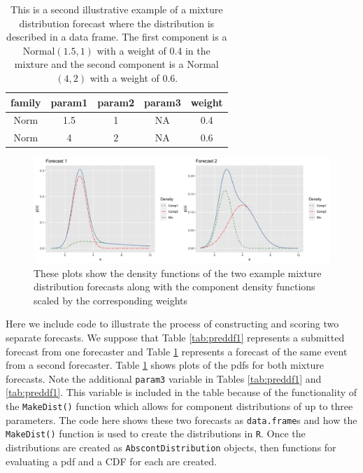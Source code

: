 \documentclass[11pt,notitlepage]{isuthesis}
\begin{document}
\begin{table}[h!]
\centering
 \begin{tabular}{|c|c|c|c|c|}
 \hline
    family & param1 & param2 & param3 & weight
    \\ \hline
    Norm & 1.5 & 1 & NA & 0.4  \\
    Norm & 4 & 2 & NA & 0.6 \\
 \hline
 \end{tabular}
  \begin{minipage}{11cm}
\captionsetup{font=scriptsize}
 \caption[Illustrative forecast 2]{This is a second
 illustrative example of a mixture distribution
 forecast where the distribution is described in a data frame. The first 
 component is a Normal$(1.5,1)$ with a weight of 0.4 in the mixture and the 
 second component is a Normal$(4,2)$ with a weight of 0.6.}
 \label{tab:preddf2}
 \end{minipage}
\end{table}

\begin{figure}[htbp]
\centerline{\includegraphics[scale=.15]{Images/toyfors12.png}}
\begin{center}
 \begin{minipage}{11cm}
\captionsetup{font=scriptsize}
\caption[Example mixture distributions]{These plots show the density functions 
of
the two example mixture distribution forecasts along with the component density
functions scaled by the corresponding weights}
\label{fig:toymixs}
\end{minipage}
\end{center}
\end{figure}

Here we include code to illustrate the process of constructing and scoring two 
separate forecasts. We suppose that Table \ref{tab:preddf1} represents a 
submitted forecast from one forecaster and Table \ref{tab:preddf2} represents
a forecast of the same event from a second forecaster. Table \ref{fig:toymixs}
shows plots of the pdfs for both mixture forecasts.
Note the additional \texttt{param3} variable
in Tables \ref{tab:preddf1} and \ref{tab:preddf1}. This variable is included
in the table because of the functionality of the \texttt{MakeDist()} function
which allows for component distributions of up to three parameters.
The code here shows these two forecasts as \texttt{data.frame}s and how the 
\texttt{MakeDist()} 
function is used to create the distributions in \texttt{R}. Once the 
distributions are created as \texttt{AbscontDistribution} objects, then 
functions for evaluating a pdf and a CDF for each are created.
\end{document}
